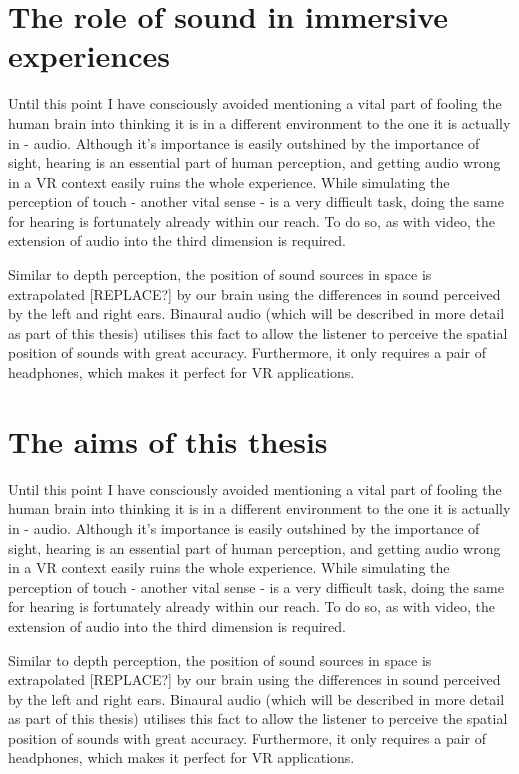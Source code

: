 \section*{The role of sound in immersive experiences}

Until this point I have consciously avoided mentioning a vital part of fooling the human brain into thinking 
it is in a different environment to the one it is actually in - audio.
Although it's importance is easily outshined by the importance of sight, hearing is an essential part of human perception, 
and getting audio wrong in a VR context easily ruins the whole experience.
While simulating the perception of touch - another vital sense - is a very difficult task, doing the same for hearing is fortunately already within our reach.
To do so, as with video, the extension of audio into the third dimension is required.

Similar to depth perception, the position of sound sources in space is extrapolated [REPLACE?] by our brain using the differences in
sound perceived by the left and right ears.
Binaural audio (which will be described in more detail as part of this thesis) utilises this fact to allow the listener to
perceive the spatial position of sounds with great accuracy. 
Furthermore, it only requires a pair of headphones, which makes it perfect for VR applications.

\section*{The aims of this thesis}

Until this point I have consciously avoided mentioning a vital part of fooling the human brain into thinking 
it is in a different environment to the one it is actually in - audio.
Although it's importance is easily outshined by the importance of sight, hearing is an essential part of human perception, 
and getting audio wrong in a VR context easily ruins the whole experience.
While simulating the perception of touch - another vital sense - is a very difficult task, doing the same for hearing is fortunately already within our reach.
To do so, as with video, the extension of audio into the third dimension is required.

Similar to depth perception, the position of sound sources in space is extrapolated [REPLACE?] by our brain using the differences in
sound perceived by the left and right ears.
Binaural audio (which will be described in more detail as part of this thesis) utilises this fact to allow the listener to
perceive the spatial position of sounds with great accuracy. 
Furthermore, it only requires a pair of headphones, which makes it perfect for VR applications.